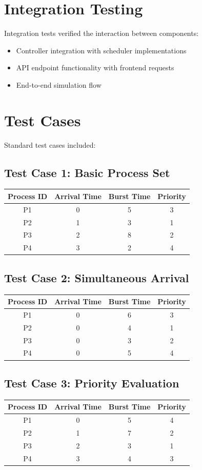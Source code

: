 \documentclass[12pt,a4paper]{report}
\begin{document}
\section{Integration Testing}
Integration tests verified the interaction between components:
\begin{itemize}
    \item Controller integration with scheduler implementations
    \item API endpoint functionality with frontend requests
    \item End-to-end simulation flow
\end{itemize}

\section{Test Cases}
Standard test cases included:

\subsection{Test Case 1: Basic Process Set}
\begin{tabular}{|c|c|c|c|}
\hline
Process ID & Arrival Time & Burst Time & Priority \\
\hline
P1 & 0 & 5 & 3 \\
P2 & 1 & 3 & 1 \\
P3 & 2 & 8 & 2 \\
P4 & 3 & 2 & 4 \\
\hline
\end{tabular}

\subsection{Test Case 2: Simultaneous Arrival}
\begin{tabular}{|c|c|c|c|}
\hline
Process ID & Arrival Time & Burst Time & Priority \\
\hline
P1 & 0 & 6 & 3 \\
P2 & 0 & 4 & 1 \\
P3 & 0 & 3 & 2 \\
P4 & 0 & 5 & 4 \\
\hline
\end{tabular}

\subsection{Test Case 3: Priority Evaluation}
\begin{tabular}{|c|c|c|c|}
\hline
Process ID & Arrival Time & Burst Time & Priority \\
\hline
P1 & 0 & 5 & 4 \\
P2 & 1 & 7 & 2 \\
P3 & 2 & 3 & 1 \\
P4 & 3 & 4 & 3 \\
\hline
\end{tabular}
\end{document}
